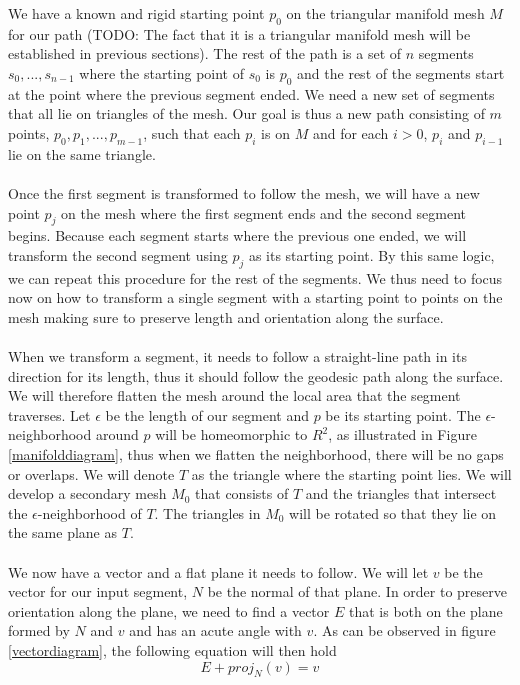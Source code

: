 We have a known and rigid starting point $p_0$ on the triangular manifold mesh $M$ for our path (TODO: The fact that it is a triangular manifold mesh will be established in previous sections). The rest of the path is a set of $n$ segments $s_0,...,s_{n-1}$ where the starting point of $s_0$ is $p_0$ and the rest of the segments start at the point where the previous segment ended. We need a new set of segments that all lie on triangles of the mesh. Our goal is thus a new path consisting of $m$ points, $p_0, p_1,...,p_{m-1}$, such that each $p_i$ is on $M$ and for each $i>0$, $p_{i}$ and $p_{i-1}$ lie on the same triangle. \\
\\
Once the first segment is transformed to follow the mesh, we will have a new point $p_j$ on the mesh where the first segment ends and the second segment begins. Because each segment starts where the previous one ended, we will transform the second segment using $p_j$ as its starting point. By this same logic, we can repeat this procedure for the rest of the segments. We thus need to focus now on how to transform a single segment with a starting point to points on the mesh making sure to preserve length and orientation along the surface. \\
\\
When we transform a segment, it needs to follow a straight-line path in its direction for its length, thus it should follow the geodesic path along the surface. We will therefore flatten the mesh around the local area that the segment traverses. Let $\epsilon$ be the length of our segment and $p$ be its starting point. The $\epsilon$-neighborhood around $p$ will be homeomorphic to $R^2$, as illustrated in Figure \ref{manifolddiagram}, thus when we flatten the neighborhood, there will be no gaps or overlaps. We will denote $T$ as the triangle where the starting point lies. We will develop a secondary mesh $M_0$ that consists of $T$ and the triangles that intersect the $\epsilon$-neighborhood of $T$. The triangles in $M_0$ will be rotated so that they lie on the same plane as $T$. \\
\\
We now have a vector and a flat plane it needs to follow. We will let $v$ be the vector for our input segment, $N$ be the normal of that plane. In order to preserve orientation along the plane, we need to find a vector $E$ that is both on the plane formed by $N$ and $v$ and has an acute angle with $v$. As can be observed in figure \ref{vectordiagram}, the following equation will then hold
\[
E + proj_N(v) = v
\]

